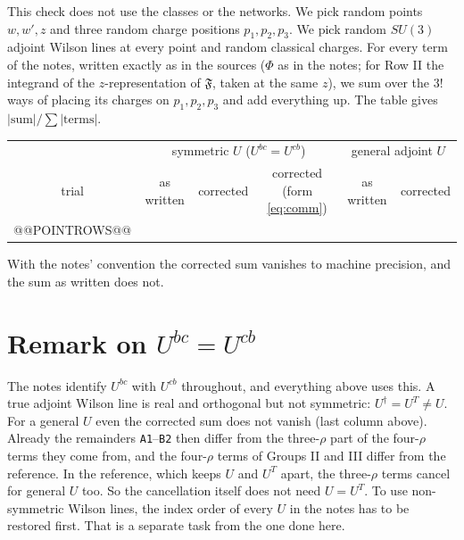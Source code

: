 \documentclass[10pt]{article}
\numberwithin{equation}{section}
\newcommand{\lab}[1]{\texttt{#1}}
\begin{document}
This check does not use the classes or the networks. We pick random points $w,w',z$ and three random charge positions $p_1,p_2,p_3$. We pick random $SU(3)$ adjoint Wilson lines at every point and random classical charges. For every term of the notes, written exactly as in the sources ($\Phi$ as in the notes; for Row II the integrand of the $z$-representation of $\mathfrak F$, taken at the same $z$), we sum over the $3!$ ways of placing its charges on $p_1,p_2,p_3$ and add everything up. The table gives $|\text{sum}|/\sum|\text{terms}|$.

\begin{center}\small
\begin{tabular}{@{}c c c c c c@{}}
& \multicolumn{3}{c}{symmetric $U$ ($U^{bc}=U^{cb}$)} & \multicolumn{2}{c}{general adjoint $U$}\\
trial & as written & corrected & corrected (form \eqref{eq:comm}) & as written & corrected\\ \hline
@@POINTROWS@@
\end{tabular}
\end{center}
With the notes' convention the corrected sum vanishes to machine precision, and the sum as written does not.

\section{Remark on \texorpdfstring{$U^{bc}=U^{cb}$}{U symmetric}}\label{sec:Usym}

The notes identify $U^{bc}$ with $U^{cb}$ throughout, and everything above uses this. A true adjoint Wilson line is real and orthogonal but not symmetric: $U^{\dagger}=U^T\neq U$. For a general $U$ even the corrected sum does not vanish (last column above). Already the remainders \lab{A1}--\lab{B2} then differ from the three-$\rho$ part of the four-$\rho$ terms they come from, and the four-$\rho$ terms of Groups II and III differ from the reference. In the reference, which keeps $U$ and $U^T$ apart, the three-$\rho$ terms cancel for general $U$ too. So the cancellation itself does not need $U=U^T$. To use non-symmetric Wilson lines, the index order of every $U$ in the notes has to be restored first. That is a separate task from the one done here.

\appendix
\end{document}
